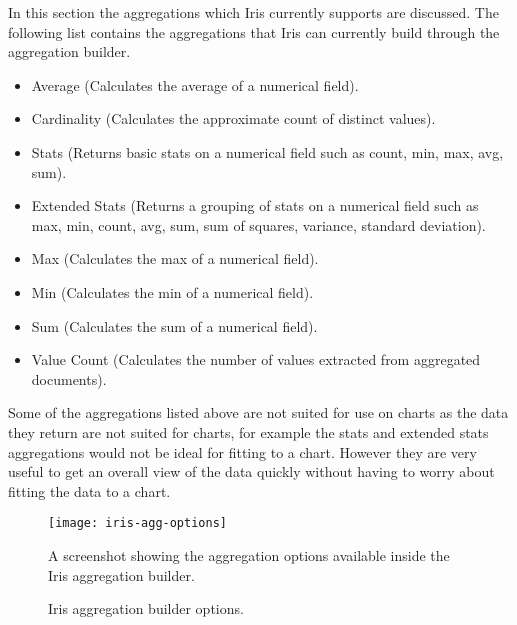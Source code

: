 \documentclass[12pt,a4paper,titlepage]{report}
\begin{document}
In this section the aggregations which Iris currently supports are discussed. The following list contains the aggregations that Iris can currently build through the aggregation builder.
\begin{itemize}
    \item Average (Calculates the average of a numerical field).
    \item Cardinality (Calculates the approximate count of distinct values).
    \item Stats (Returns basic stats on a numerical field such as count, min, max, avg, sum).
    \item Extended Stats (Returns a grouping of stats on a numerical field such as max, min, count, avg, sum, sum of squares, variance, standard deviation).
    \item Max (Calculates the max of a numerical field).
    \item Min (Calculates the min of a numerical field).
    \item Sum (Calculates the sum of a numerical field).
    \item Value Count (Calculates the number of values extracted from aggregated documents).
\end{itemize}  
Some of the aggregations listed above are not suited for use on charts as the data they return are not suited for charts, for example the stats and extended stats aggregations would not be ideal for fitting to a chart. However they are very useful to get an overall view of the data quickly without having to worry about fitting the data to a chart.
\begin{figure}[H]
\begin{tcolorbox}
\begin{center}
\texttt{[image: iris-agg-options]}
\end{center}
A screenshot showing the aggregation options available inside the Iris aggregation builder.
\end{tcolorbox}
\caption{Iris aggregation builder options.}
\end{figure}
\end{document}
